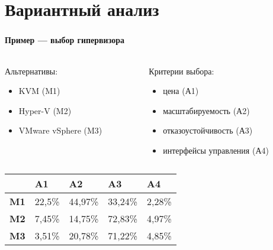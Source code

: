 
\section{Вариантный анализ}

\begin{frame}
\frametitle{\insertsection}
\framesubtitle{Пример --- выбор гипервизора}

\begin{columns}
    \begin{column}{0.45\textwidth}
        Альтернативы:
        \vspace{\baselineskip}
        \begin{itemize}
            \item KVM (M1)
            \item Hyper-V (M2)
            \item VMware vSphere (M3)
        \end{itemize}
    \end{column}
    \begin{column}{0.55\textwidth}
        Критерии выбора:
        \begin{itemize}
            \item цена (А1)
            \item масштабируемость (А2)
            \item отказоустойчивость (А3)
            \item интерфейсы управления (А4)
        \end{itemize}
    \end{column}
\end{columns}

\begin{table}
    \begin{tabular}{|l|l|l|l|l|}
        \hline  & \textbf{A1} & \textbf{A2} & \textbf{A3} & \textbf{A4} \\
        \hline \textbf{M1} & 22,5\% & 44,97\% & 33,24\% & 2,28\% \\
        \hline \textbf{M2} & 7,45\% & 14,75\% & 72,83\% & 4,97\% \\
        \hline \textbf{M3} & 3,51\% & 20,78\% & 71,22\% & 4,85\% \\
        \hline
  \end{tabular}
\end{table}

\end{frame}

